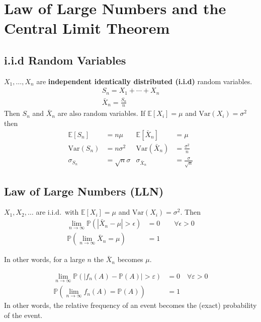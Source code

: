 \section{Law of Large Numbers and the Central Limit Theorem}

\subsection{i.i.d Random Variables}

$X_1, \ldots , X_n$ are \textbf{independent identically distributed (i.i.d)} random variables.
\begin{gather*}
    S_n = X_1 + \cdots + X_n \\
    \bar{X}_n = \frac{S_n}{n}
\end{gather*}
Then $S_n$ and $ \bar{X}_n$ are also random variables.
\newpar{}
If $\mathbb{E}[X_i]=\mu$ and $\mathrm{Var}(X_i)=\sigma^2$ then
\begin{align*}
    \mathbb{E}[S_n]         & =n\mu                    & 
    \mathbb{E}[\bar{X}_n]   & =\mu                         \\
    \mathrm{Var}(S_n)       & =n\sigma^2               & 
    \mathrm{Var}(\bar{X}_n) & =\frac{\sigma^2}{n}          \\
    \sigma_{S_n}            & =\sqrt{n}\sigma          & 
    \sigma_{\bar{X}_n}      & =\frac{\sigma}{\sqrt{n}}
\end{align*}

\subsection{Law of Large Numbers (LLN)}
$X_1, X_2, \ldots$ are i.i.d.\ with $\mathbb{E}[X_i]=\mu$ and $\mathrm{Var}(X_i)=\sigma^2$. Then
\begin{align*}
    \lim_{n\to\infty}\mathbb{P}\left(\left|\bar{X}_n-\mu\right|>\epsilon\right) & =0 \qquad \forall \epsilon > 0 \\
    \mathbb{P}\left(\lim_{n\to\infty}\bar{X}_n=\mu\right)                       & =1
\end{align*}

In other words, for a large $n$ the $\bar{X}_n$ becomes $\mu$.

\newpar{}
\begin{align*}
    \lim_{n\to\infty}\mathbb{P}(|f_n(A)-\mathbb{P}(A)|>\varepsilon) & =0\quad \forall \varepsilon>0 \\
    \mathbb{P}\left(\lim_{n\to\infty}f_n(A)=\mathbb{P}(A)\right)    & =1
\end{align*}
In other words, the relative frequency of an event becomes the (exact) probability of the event.


